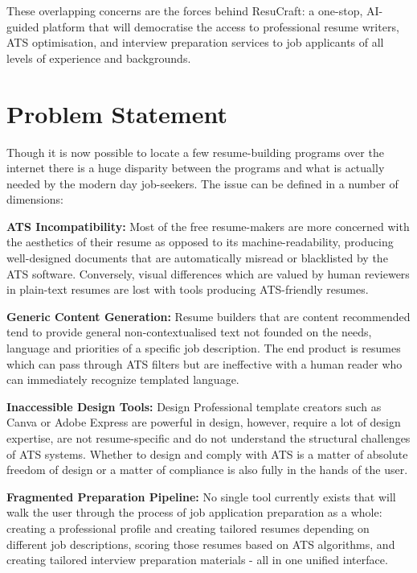 \documentclass[12pt, a4paper, oneside]{report}
\begin{document}
These overlapping concerns are the forces behind ResuCraft: a one-stop, AI-guided platform that will democratise the access to professional resume writers, ATS optimisation, and interview preparation services to job applicants of all levels of experience and backgrounds.

\section{Problem Statement}

Though it is now possible to locate a few resume-building programs over the internet there is a huge disparity between the programs and what is actually needed by the modern day job-seekers. The issue can be defined in a number of dimensions:


\textbf{ATS Incompatibility:} Most of the free resume-makers are more concerned with the aesthetics of their resume as opposed to its machine-readability, producing well-designed documents that are automatically misread or blacklisted by the ATS software. Conversely, visual differences which are valued by human reviewers in plain-text resumes are lost with tools producing ATS-friendly resumes\cite{resumeworded2022}.

\textbf{Generic Content Generation:} Resume builders that are content recommended tend to provide general non-contextualised text not founded on the needs, language and priorities of a specific job description. The end product is resumes which can pass through ATS filters but are ineffective with a human reader who can immediately recognize templated language\cite{theladders2018}.

\textbf{Inaccessible Design Tools:} Design Professional template creators such as Canva or Adobe Express are powerful in design, however, require a lot of design expertise, are not resume-specific and do not understand the structural challenges of ATS systems. Whether to design and comply with ATS is a matter of absolute freedom of design or a matter of compliance is also fully in the hands of the user.

\textbf{Fragmented Preparation Pipeline:}  No single tool currently exists that will walk the user through the process of job application preparation as a whole: creating a professional profile and creating tailored resumes depending on different job descriptions, scoring those resumes based on ATS algorithms, and creating tailored interview preparation materials - all in one unified interface.
\end{document}
